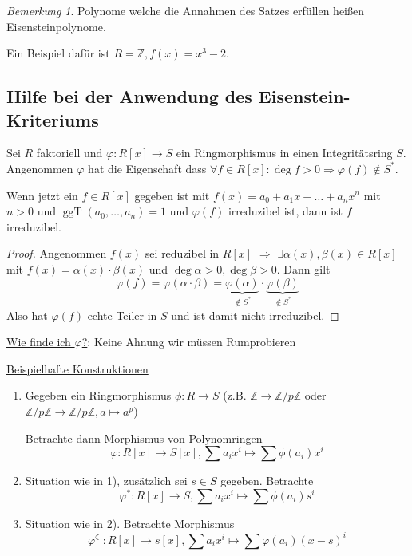 \documentclass[12pt,parskip=full]{scrartcl}
\newcommand{\setZ}{\mathbb{Z}}
\newcommand{\heading}{\underline}
\theoremstyle{definition}
\theoremstyle{remark}
\newtheorem*{remark}{Bemerkung}
\begin{document}
	\begin{remark}
		Polynome welche die Annahmen des Satzes erfüllen heißen Eisensteinpolynome.
		
		Ein Beispiel dafür ist $R = \setZ, f(x) = x^3 - 2$.
	\end{remark}

	\subsection{Hilfe bei der Anwendung des Eisenstein-Kriteriums}
	
	Sei $R$ faktoriell und $\varphi: R[x] \to S$ ein Ringmorphismus in einen Integritätsring $S$. Angenommen $\varphi$ hat die Eigenschaft dass $\forall f \in R[x]: \deg f > 0 \Rightarrow \varphi(f) \notin S^*$.
	
	Wenn jetzt ein $f \in R[x]$ gegeben ist mit $f(x) = a_0 + a_1 x + \dots + a_n x^n$ mit $n > 0$ und $\operatorname{ggT}(a_0, \dots, a_n) = 1$ und $\varphi(f)$ irreduzibel ist, dann ist $f$ irreduzibel.
	
	\begin{proof}
		Angenommen $f(x)$ sei reduzibel in $R[x]$ $\Rightarrow$ $\exists \alpha(x), \beta(x) \in R[x]$ mit $f(x) = \alpha(x) \cdot \beta(x)$ und $\deg \alpha > 0, \deg \beta > 0$. Dann gilt
		\begin{equation*}
			\varphi(f) = \varphi(\alpha \cdot \beta)  = \underbrace{\varphi(\alpha)}_{\notin S^*} \cdot \underbrace{\varphi(\beta)}_{\notin S^*}
		\end{equation*}
		Also hat $\varphi(f)$ echte Teiler in $S$ und ist damit nicht irreduzibel.
	\end{proof}

	\heading{Wie finde ich $\varphi$?}: Keine Ahnung wir müssen Rumprobieren
	
	\heading{Beispielhafte Konstruktionen}
	
	\begin{enumerate}
		\item Gegeben ein Ringmorphismus $\phi: R \to S$ (z.B. $\setZ \to \setZ / p \setZ$ oder $\setZ / p \setZ \to \setZ / p \setZ, a \mapsto a^p$)
		
		Betrachte dann Morphismus von Polynomringen
		\begin{equation*}
			\varphi: R[x] \to S[x], \sum a_i x^i \mapsto \sum \phi(a_i) x^i
		\end{equation*}
		
		\item Situation wie in 1), zusätzlich sei $s \in S$ gegeben. Betrachte
		\begin{equation*}
			\varphi^*: R[x] \to S, \sum a_i x^i \mapsto \sum \phi(a_i) s^i	
		\end{equation*}
		
		\item Situation wie in 2). Betrachte Morphismus
		\begin{equation*}
			\varphi^{\leftmoon}: R[x] \to s[x], \sum a_i x^i \mapsto \sum \varphi(a_i) (x - s)^i
		\end{equation*}
	\end{enumerate}
\end{document}

